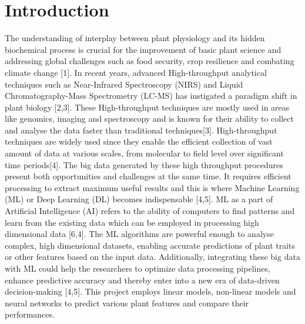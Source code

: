 \documentclass[12pt,a4paper]{report}
\begin{document}

\chapter{Introduction}

The understanding of interplay between plant physiology and its hidden biochemical process is crucial for the improvement of basic plant science and addressing global challenges such as food security, crop resilience and combating climate change [1]. 
In recent years, advanced High-throughput analytical techniques such as Near-Infrared Spectroscopy (NIRS) and Liquid Chromatography-Mass Spectrometry (LC-MS) has instigated a paradigm shift in plant biology [2,3].
These High-throughput techniques are mostly used in areas like genomics, imaging and spectroscopy and is known for their ability to collect and analyse the data faster than traditional techniques[3].
High-throughput techniques are widely used since they enable the efficient collection of vast amount of data at various scales, from molecular to field level over significant time periods[4].
The big data generated by these high throughput procedures present both opportunities and challenges at the same time. It requires efficient processing to extract maximum useful results and this is where Machine Learning (ML) or Deep Learning (DL) becomes indispensable [4,5].
ML as a part of Artificial Intelligence (AI) refers to the ability of computers to find patterns and learn from the existing data which can be employed in processing high dimensional data [6,4]. The ML algorithms are powerful enough to analyse complex, high dimensional datasets, 
enabling accurate predictions of plant traits or other features based on the input data. Additionally, integrating these big data with ML could help the researchers to optimize data processing pipelines, enhance predictive accuracy and thereby enter into a new era of data-driven decision-making [4,5]. This project employs linear models, non-linear models and neural networks to predict various plant features and compare their performances. \\
\end{document}
